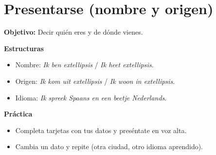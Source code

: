 \section{Presentarse (nombre y origen)}
\textbf{Objetivo:} Decir quién eres y de dónde vienes.

\textbf{Estructuras}
\begin{itemize}[leftmargin=*]
  \item Nombre: \textit{Ik ben	extellipsis{}} / \textit{Ik heet	extellipsis{}}.
  \item Origen: \textit{Ik kom uit	extellipsis{}} / \textit{Ik woon in	extellipsis{}}.
  \item Idioma: \textit{Ik spreek Spaans en een beetje Nederlands}.
\end{itemize}

\textbf{Práctica}
\begin{itemize}[leftmargin=*]
  \item Completa tarjetas con tus datos y preséntate en voz alta.
  \item Cambia un dato y repite (otra ciudad, otro idioma aprendido).
\end{itemize}
